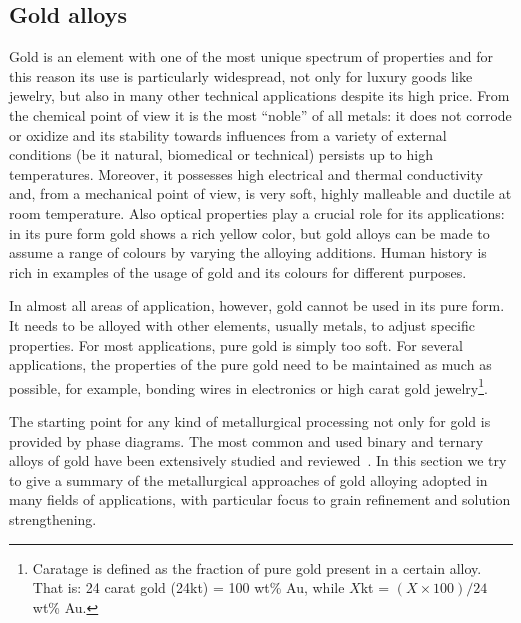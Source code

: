 \subsection{Gold alloys}
Gold is an element with one of the most unique spectrum of properties and for this reason its use is particularly widespread, not only for luxury goods like jewelry, but also in many other technical applications despite its high price.
From the chemical point of view it is the most “noble” of all metals: it does not corrode or oxidize and its stability towards influences from a variety of external conditions (be it natural, biomedical or technical) persists up to high temperatures. Moreover, it possesses high electrical and thermal conductivity and, from a mechanical point of view, is very soft, highly malleable and ductile at room temperature. Also optical properties play a crucial role for its applications: in its pure form gold shows a rich yellow color, but gold alloys can be made to assume a range of colours by varying the alloying additions. Human history is rich in examples of the usage of gold and its colours for different purposes.

In almost all areas of application, however, gold cannot be used in its pure form. It needs to be alloyed with other elements, usually metals, to adjust specific properties. For most applications, pure gold is simply too soft. For several applications, the properties of the pure gold need to be maintained as much as possible, for example, bonding wires in electronics or high carat gold jewelry\footnote{Caratage is defined as the fraction of pure gold present in a certain alloy. That is: 24 carat gold (24kt) = 100 wt\% Au, while $X$kt = $(X\times 100)/24$ wt\% Au.}.

The starting point for any kind of metallurgical processing not only for gold is provided by phase diagrams. The most common and used binary and ternary alloys of gold have been extensively studied and reviewed~\cite{OkamotoBOOK1987,PrinceBOOK1990,TernaryAlloyBOOK2006}. In this section we try to give a summary of the metallurgical approaches of gold alloying adopted in many fields of applications, with particular focus to grain refinement and solution strengthening.


